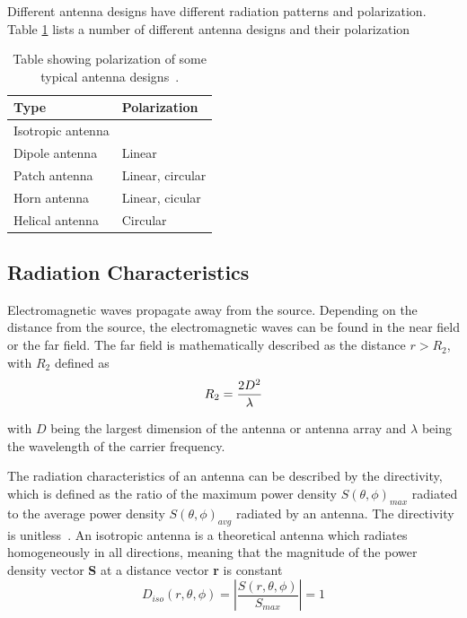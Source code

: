 Different antenna designs have different radiation patterns and polarization. Table \ref{tab:antenna_types} lists a number of different antenna designs and their polarization
\begin{table}[H]
    \centering
    \begin{tabular}{l|l} 
        \textbf{Type} & \textbf{Polarization} \\
        \hline
        \hline
        Isotropic antenna & \\
        Dipole antenna & Linear \\
        Patch antenna & Linear, circular \\
        Horn antenna & Linear, cicular \\
        Helical antenna & Circular \\
    \end{tabular}
    \caption{Table showing polarization of some typical antenna designs~\cite[p. 11]{ant_beam_form}.}
    \label{tab:antenna_types}
\end{table}

\subsection{Radiation Characteristics} \label{ss:rad_char}
Electromagnetic waves propagate away from the source. Depending on the distance from the source, the electromagnetic waves can be found in the near field or the far field. The far field is mathematically described as the distance $r>R_2$, with $R_2$ defined as~\cite[p. 4]{ant_beam_form}
\begin{equation} \label{eq:far_field}
    R_2 = \frac{2 D^2}{\lambda}
    \tagaddtext{[\si{\meter}]}
\end{equation}

with $D$ being the largest dimension of the antenna or antenna array and $\lambda$ being the wavelength of the carrier frequency.

The radiation characteristics of an antenna can be described by the directivity, which is defined as the ratio of the maximum power density $S\left( \theta, \phi \right)_{max}$ radiated to the average power density $S\left( \theta, \phi \right)_{avg}$ radiated by an antenna. The directivity is unitless~\cite[p. 63]{direct_energy}. An isotropic antenna is a theoretical antenna which radiates homogeneously in all directions, meaning that the magnitude of the power density vector \textbf{S} at a distance vector \textbf{r} is constant~\cite[p. 11]{ant_beam_form}
\begin{equation} \label{eq:isotropic_radiation}
    D_{iso}\left(r, \theta, \phi \right) = \left| \frac{S \left(r, \theta, \phi \right)}{S_{max}} \right|=1
\end{equation}

